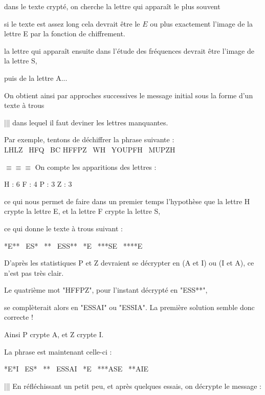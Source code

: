 \change
dans le texte crypté, on cherche la lettre qui apparaît le plus souvent

\change
si le texte est assez long cela devrait être le $E$ ou plus exactement l'image de la lettre E par la fonction de chiffrement.

\change
la lettre qui apparaît ensuite dans l'étude des fréquences devrait être l'image de la lettre S, 

\change
puis de la lettre A... 

\change
On obtient ainsi par approches successives le message initial sous la forme d'un texte à trous 

\change
||| dans lequel il faut deviner les lettres manquantes.


\diapo

Par exemple, tentons de déchiffrer la phrase suivante : \\
{LHLZ \  HFQ  \ BC HFFPZ \  WH \  YOUPFH  \ MUPZH}

\change
$\equiv \equiv \equiv $ 
On compte les apparitions des lettres : \\
\centerline{H : 6 \quad F : 4 \quad P : 3 \quad Z : 3}

\change
ce qui nous permet de faire dans un premier temps l'hypothèse que la lettre H crypte la lettre E, 
et la lettre F crypte la lettre S,

\change
ce qui donne le texte à trous suivant : 

\centerline{*E** \ ES* \ ** \ ESS** \ *E \ ***SE \ ****E}

\change

D'après les statistiques P et Z devraient se décrypter en (A et I) ou (I et A), ce n'est pas très clair.

\change

Le quatrième mot "HFFPZ", pour l'instant décrypté en "ESS**",

\change

 se complèterait alors en
"ESSAI" ou "ESSIA". La première solution semble donc correcte ! 

\change

Ainsi P crypte A, et
Z crypte I.

\change

La phrase est maintenant celle-ci : 

\centerline{*E*I \  ES* \  ** \  ESSAI \  *E \ ***ASE \ **AIE}


||| En réfléchissant un petit peu, et après quelques essais, on décrypte le message : 

